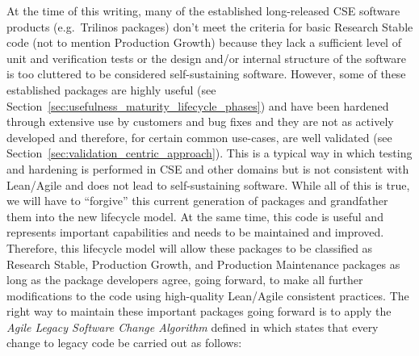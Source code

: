 \documentclass[11pt]{SANDreport}
\begin{document}
At the time of this writing, many of the established long-released CSE software products (e.g.\ Trilinos packages) don't meet the criteria for basic Research Stable code (not to mention Production Growth) because they lack a sufficient level of unit and verification tests or the design and/or internal structure of the software is too cluttered to be considered self-sustaining software.  However, some of these established packages are highly useful (see Section~\ref{sec:usefulness_maturity_lifecycle_phases}) and have been hardened through extensive use by customers and bug fixes and they are not as actively developed and therefore, for certain common use-cases, are well validated (see Section~\ref{sec:validation_centric_approach}).  This is a typical way in which testing and hardening is performed in CSE and other domains but is not consistent with Lean/Agile and does not lead to self-sustaining software.  While all of this is true, we will have to ``forgive'' this current generation of packages and grandfather them into the new lifecycle model.  At the same time, this code is useful and represents important capabilities and needs to be maintained and improved.  Therefore, this lifecycle model will allow these packages to be classified as Research Stable, Production Growth, and Production Maintenance packages as long as the package developers agree, going forward, to make all further modifications to the code using high-quality Lean/Agile consistent practices.  The right way to maintain these important packages going forward is to apply the {}\textit{Agile Legacy Software Change Algorithm} defined in {}\cite{WorkingEffectivelyWithLegacyCode05} which states that every change to legacy code be carried out as follows:
\end{document}
